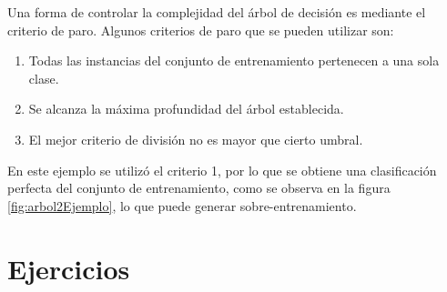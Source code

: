 \documentclass[
10pt, %
a4paper, %
]{article}
\begin{document}
Una forma de controlar la complejidad del árbol de decisión es mediante el criterio de paro. Algunos criterios de paro que se pueden utilizar son:
\begin{enumerate}
	\item Todas las instancias del conjunto de entrenamiento pertenecen a una sola clase.
	\item Se alcanza la máxima profundidad del árbol establecida.
	\item El mejor criterio de división no es mayor que cierto umbral.
\end{enumerate}

En este ejemplo se utilizó el criterio 1, por lo que se obtiene una clasificación perfecta del conjunto de entrenamiento, como se observa en la figura \ref{fig:arbol2Ejemplo}, 
lo que puede generar sobre-entrenamiento.


\section{Ejercicios}
\end{document}
